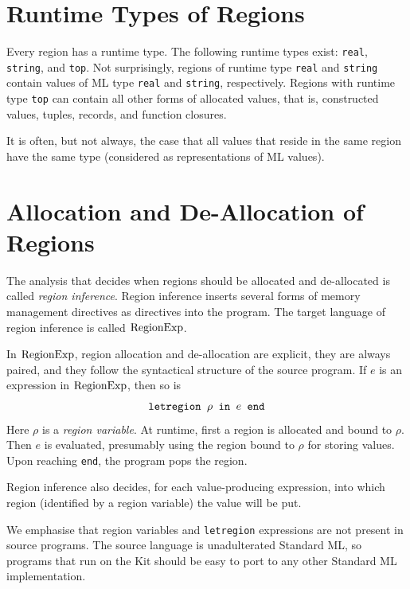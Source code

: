 \documentclass[12pt]{book}
\begin{document}
\section{Runtime Types of Regions}
\label{runtimetypes.sec}
Every region has a 
%
runtime type. The following runtime types exist: {\tt real}, {\tt
  string}, and {\tt top}. Not surprisingly, regions of runtime type
{\tt real} and {\tt string} contain values of ML type {\tt real} and
{\tt string}, respectively.  Regions with runtime type {\tt top} can
contain all other forms of allocated values, that is, constructed
values, tuples, records, and function closures.

It is often, but not always, the case that all values that reside in the
same region have the same type (considered as representations of ML values).
 
\section{Allocation and De-Allocation of Regions}
\label{aldeal.sec}
The analysis that decides when regions should be allocated and de-allocated
is called {\em region inference}. Region inference inserts 
several forms of memory management directives
as directives into the program.
The target language of region inference is called $\hbox{\rm RegionExp}$.

In $\hbox{\rm RegionExp}$, 
region allocation and de-allocation are explicit, they are always paired,
and they follow
the syntactical structure of the source program. 
If $e$ is an expression in $\hbox{\rm RegionExp}$, then so is
$$\hbox{\tt letregion $\rho$ in $e$ end}$$
Here $\rho$ is a 
%
{\em region variable}. At runtime, first a region
is allocated and bound to $\rho$. Then $e$ is evaluated, presumably using
the region bound to $\rho$ for storing values. Upon reaching {\tt end}, the program pops the
region.

Region inference also decides, for each value-producing expression, 
into which region (identified by a region variable) the value will be put.

We emphasise that region variables and {\tt letregion} expressions are
not present in source programs. The source language is unadulterated
Standard ML, so programs  that run on the Kit should be easy to port to any 
other Standard ML implementation.

\end{document}
